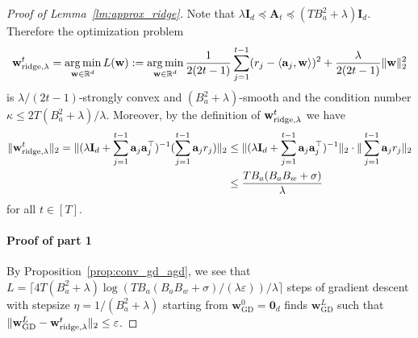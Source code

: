 \documentclass[10pt]{article}
\newcommand{\id}{\bI}
\newcommand{\eps}{\varepsilon}
\DeclareMathOperator*{\argmin}{arg\,min}
\newcommand{\<}{\left\langle}
\renewcommand{\>}{\right\rangle}
\newcommand{\bzero}{{\mathbf 0}}
\newcommand{\ridge}{{\rm ridge}}
\newcommand{\R}{\mathbb{R}}
\newcommand{\GD}{{\mathrm{GD}}}
\def\bA{{\mathbf A}}
\def\bI{{\mathbf I}}
\def\ba{{\mathbf a}}
\def\bw{{\mathbf w}}
\begin{document}
\begin{proof}[Proof of Lemma~\ref{lm:approx_ridge}]

Note that $\lambda\id_d\preceq \bA_t\preceq (TB_a^2+\lambda)\id_d$. Therefore the optimization problem 
$$\bw^t_{\ridge,\lambda}=\argmin_{\bw\in\R^d}L(\bw):=\argmin_{\bw\in\R^d}\frac{1}{2(2t-1)}\sum_{j=1}^{t-1}(r_j-\<\ba_j,\bw\>)^2+\frac{\lambda}{2(2t-1)}\|\bw\|_2^2$$
is $\lambda/(2t-1)$-strongly convex  and $(B_a^2+\lambda)$-smooth and the condition number $\kappa\leq 2T(B_a^2+\lambda)/\lambda$. Moreover, by the definition of $\bw_{\ridge,\lambda}^t$ we have 
\begin{align*}
    \|\bw^t_{\ridge,\lambda}\|_2=\|(\lambda\id_d+\sum_{j=1}^{t-1}\ba_j\ba_j^\top)^{-1}(\sum_{j=1}^{t-1}\ba_jr_j)\|_2&\leq 
    \|(\lambda\id_d+\sum_{j=1}^{t-1}\ba_j\ba_j^\top)^{-1}\|_2\cdot\|\sum_{j=1}^{t-1}\ba_jr_j\|_2\\&\leq
    \frac{TB_a(B_aB_w+\sigma)}{\lambda}
\end{align*} 
for all $t\in[T]$. 
\paragraph{Proof of part 1}
By Proposition~\ref{prop:conv_gd_agd}, we see that $L=\lceil4T(B_a^2+\lambda)\log({TB_a(B_aB_w+\sigma)}/({\lambda}\eps))/\lambda\rceil$ steps of gradient descent with stepsize $\eta=1/(B_a^2+\lambda)$ starting from $\bw_{\GD}^0=\bzero_d$ finds $\bw^L_\GD$ such that $\|\bw^L_{\GD}-\bw^t_{\ridge,\lambda}\|_2\leq\eps$.


\end{proof}
\end{document}
